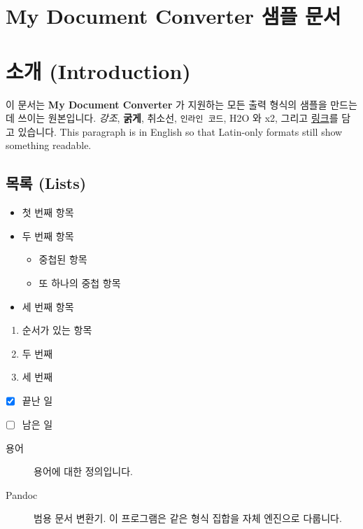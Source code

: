 \documentclass[11pt]{article}
\date{}
\begin{document}
\section*{My Document Converter 샘플 문서}\label{my-document-converter-샘플-문서}

\section*{소개 (Introduction)}\label{소개-introduction}

이 문서는 \textbf{My Document Converter} 가 지원하는 모든 출력 형식의 샘플을 만드는 데 쓰이는
원본입니다.
\emph{강조}, \textbf{굵게}, 취소선, \verb|인라인 코드|, H2O 와 x2, 그리고
\href{https://example.com}{링크}를 담고 있습니다. This paragraph is in
English so that Latin-only formats still show something readable.

\subsection*{목록 (Lists)}\label{목록-lists}

\begin{itemize}
\item 첫 번째 항목
\item 두 번째 항목
\begin{itemize}
\item 중첩된 항목
\item 또 하나의 중첩 항목
\end{itemize}
\item 세 번째 항목
\end{itemize}

\begin{enumerate}
\item 순서가 있는 항목
\item 두 번째
\item 세 번째
\end{enumerate}

\begin{itemize}
\item ☒ 끝난 일
\item ☐ 남은 일
\end{itemize}

\begin{description}
\item[용어] 용어에 대한 정의입니다.
\item[Pandoc] 범용 문서 변환기. 이 프로그램은 같은 형식 집합을 자체 엔진으로 다룹니다.
\end{description}
\end{document}
